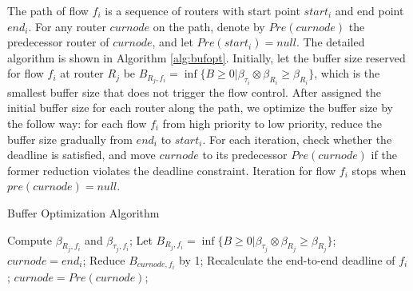 \documentclass[10pt,journal]{IEEEtran}
\begin{document}
The path of flow $f_i$ is a sequence of routers with start point $start_i$ and end point $end_i$. For any router $curnode$ on the path, denote by $Pre(curnode)$ the predecessor router of $curnode$, and let $Pre(start_i)=null$. The detailed algorithm is shown in Algorithm \ref{alg:bufopt}. Initially, let the buffer size reserved for flow $f_i$ at router $R_j$ be $B_{R_j,f_i}=\inf\{B\geq 0|\beta_{\tau_i}\otimes\beta_{R_i}\geq \beta_{R_i}\}$, which is the smallest buffer size that does not trigger the flow control. After assigned the initial buffer size for each router along the path, we optimize the buffer size by the follow way: for each flow $f_i$ from high priority to low priority, reduce the buffer size gradually from $end_i$ to $start_i$. For each iteration, check whether the deadline is satisfied, and move $curnode$ to its predecessor $Pre(curnode)$ if the former reduction violates the deadline constraint. Iteration for flow $f_i$ stops when $pre(curnode)=null$.
\begin{algorithm}
\caption{Buffer Optimization Algorithm}
\label{alg:bufopt}
\begin{algorithmic}[1]
        \STATE Compute $\beta_{R_j,f_i}$ and $\beta_{\tau_j,f_i}$;
        \STATE Let $B_{R_j,f_i}=\inf\{B\geq 0|\beta_{\tau_j}\otimes\beta_{R_j}\geq \beta_{R_j}\}$;
    \ENDFOR
        \STATE $curnode=end_i$;
                \STATE Reduce $B_{curnode,f_i}$ by 1;
                \STATE Recalculate the end-to-end deadline of $f_i$;
            \ENDWHILE
            \STATE $curnode=Pre(curnode)$;
        \ENDWHILE
    \ENDFOR
\end{algorithmic}
\end{algorithm}
\end{document}

